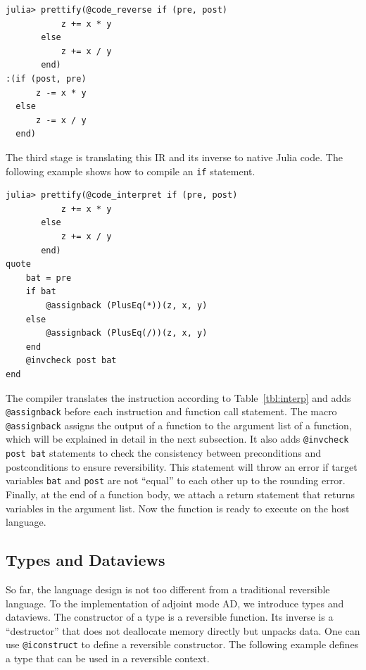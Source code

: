 \documentclass[aps,twocolumn,longbibliography,english,superscriptaddress]{revtex4-1}
\newcommand{\<}{\langle}
\renewcommand{\>}{\rangle}
\newcommand{\Tbl}[1]{Table~\ref{#1}}
\theoremstyle{definition}\newtheorem{definition}{\textit{Definition}}
\begin{document}
\begin{minipage}{.44\textwidth}
\begin{lstlisting}
julia> prettify(@code_reverse if (pre, post)
           z += x * y
       else
           z += x / y
       end)
:(if (post, pre)
      z -= x * y
  else
      z -= x / y
  end)
\end{lstlisting}
\end{minipage}

The third stage is translating this IR and its inverse to native Julia code. The following example shows how to compile an \texttt{if} statement.

\begin{minipage}{.44\textwidth}
\begin{lstlisting}
julia> prettify(@code_interpret if (pre, post)
           z += x * y
       else
           z += x / y
       end)
quote
    bat = pre
    if bat
        @assignback (PlusEq(*))(z, x, y)
    else
        @assignback (PlusEq(/))(z, x, y)
    end
    @invcheck post bat
end
\end{lstlisting}
\end{minipage}

The compiler translates the instruction according to \Tbl{tbl:interp} and adds \texttt{@assignback} before each instruction and function call statement. The macro \texttt{@assignback} assigns the output of a function to the argument list of a function, which will be explained in detail in the next subsection.
It also adds \texttt{@invcheck post bat} statements to check the consistency between preconditions and postconditions to ensure reversibility. This statement will throw an error if target variables \texttt{bat} and \texttt{post} are not ``equal'' to each other up to the rounding error.
Finally, at the end of a function body, we attach a return statement that returns variables in the argument list.
Now the function is ready to execute on the host language.

\subsection{Types and Dataviews}
So far, the language design is not too different from a traditional reversible language. To the implementation of adjoint mode AD, we introduce types and dataviews.
The constructor of a type is a reversible function.
Its inverse is a ``destructor'' that does not deallocate memory directly but unpacks data.
One can use \texttt{@iconstruct} to define a reversible constructor.
The following example defines a type that can be used in a reversible context.
\end{document}
